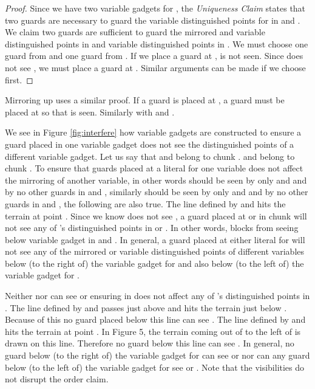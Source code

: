 \documentclass[11pt]{article}
\begin{document}
\begin{proof}
Since we have two variable gadgets for , the {\em Uniqueness Claim} states that two guards are necessary to guard the variable distinguished points for  in  and .  We claim two guards are sufficient to guard the mirrored and variable distinguished points in  and variable distinguished points in .  We must choose one guard from  and one guard from .  If we place a guard at ,  is not seen.  
Since  does not see , we must place a guard at .  Similar arguments can be made if we choose  first.
\end{proof}

Mirroring up uses a similar proof.  If a guard is placed at , a guard must be placed at  so that  is seen.  Similarly with  and .  

We see in Figure \ref{fig:interfere} how variable gadgets are constructed to ensure a guard placed in one variable gadget does not see the distinguished points of a different variable gadget.  Let us say that  and  belong to chunk .   and  belong to chunk .  To ensure that guards placed at a literal for one variable does not affect the mirroring of another variable, in other words  should be seen by only  and  and by no other guards in  and , similarly  should be seen by only  and  and by no other guards in  and , the following are also true.  The line defined by  and  hits the terrain at point .  Since we know  does not see , a guard placed at  or  in chunk  will not see any of 's distinguished points in  or .  In other words,  blocks  from seeing below variable gadget  in  and .  In general, a guard placed at either literal for  will not see any of the mirrored or variable distinguished points of different variables below (to the right of) the variable gadget for  and also below (to the left of) the variable gadget for .

Neither  nor  can see  or  ensuring  in  does not affect any of 's distinguished points in .  The line defined by  and  passes just above  and hits the terrain just below .  Because of this no guard placed below this line can see .  The line defined by  and  hits the terrain at point .  In Figure 5, the terrain coming out of  to the left of  is drawn on this line.  Therefore no guard below this line can see .  In general, no guard below (to the right of) the variable gadget for  can see  or  nor can any guard below (to the left of) the variable gadget for  see  or .  Note that the visibilities do not disrupt the order claim.
\end{document}
